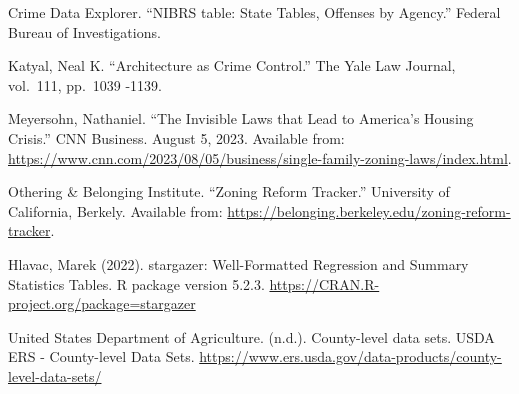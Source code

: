 \documentclass[
  12pt,
]{article}
\begin{document}
Crime Data Explorer. ``NIBRS table: State Tables, Offenses by Agency.''
Federal Bureau of Investigations.

Katyal, Neal K. ``Architecture as Crime Control.'' The Yale Law Journal,
vol.~111, pp.~1039 -1139.

Meyersohn, Nathaniel. ``The Invisible Laws that Lead to America's
Housing Crisis.'' CNN Business. August 5, 2023. Available from:
\url{https://www.cnn.com/2023/08/05/business/single-family-zoning-laws/index.html}.

Othering \& Belonging Institute. ``Zoning Reform Tracker.'' University
of California, Berkely. Available from:
\url{https://belonging.berkeley.edu/zoning-reform-tracker}.

Hlavac, Marek (2022). stargazer: Well-Formatted Regression and Summary
Statistics Tables. R package version 5.2.3.
\url{https://CRAN.R-project.org/package=stargazer}

United States Department of Agriculture. (n.d.). County-level data sets.
USDA ERS - County-level Data Sets.
\url{https://www.ers.usda.gov/data-products/county-level-data-sets/}
\end{document}
